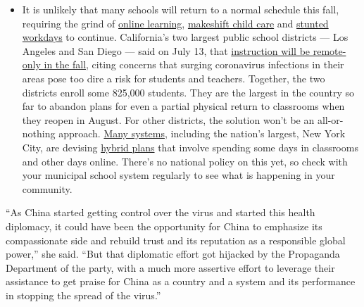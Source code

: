 \begin{itemize}
  \begin{itemize}
  \tightlist
  \item
    It is unlikely that many schools will return to a normal schedule
    this fall, requiring the grind of
    \href{https://www.nytimes3xbfgragh.onion/2020/06/05/us/coronavirus-education-lost-learning.html?action=click\&pgtype=Article\&state=default\&region=MAIN_CONTENT_3\&context=storylines_faq}{online
    learning},
    \href{https://www.nytimes3xbfgragh.onion/2020/05/29/us/coronavirus-child-care-centers.html?action=click\&pgtype=Article\&state=default\&region=MAIN_CONTENT_3\&context=storylines_faq}{makeshift
    child care} and
    \href{https://www.nytimes3xbfgragh.onion/2020/06/03/business/economy/coronavirus-working-women.html?action=click\&pgtype=Article\&state=default\&region=MAIN_CONTENT_3\&context=storylines_faq}{stunted
    workdays} to continue. California's two largest public school
    districts --- Los Angeles and San Diego --- said on July 13, that
    \href{https://www.nytimes3xbfgragh.onion/2020/07/13/us/lausd-san-diego-school-reopening.html?action=click\&pgtype=Article\&state=default\&region=MAIN_CONTENT_3\&context=storylines_faq}{instruction
    will be remote-only in the fall}, citing concerns that surging
    coronavirus infections in their areas pose too dire a risk for
    students and teachers. Together, the two districts enroll some
    825,000 students. They are the largest in the country so far to
    abandon plans for even a partial physical return to classrooms when
    they reopen in August. For other districts, the solution won't be an
    all-or-nothing approach.
    \href{https://bioethics.jhu.edu/research-and-outreach/projects/eschool-initiative/school-policy-tracker/}{Many
    systems}, including the nation's largest, New York City, are
    devising
    \href{https://www.nytimes3xbfgragh.onion/2020/06/26/us/coronavirus-schools-reopen-fall.html?action=click\&pgtype=Article\&state=default\&region=MAIN_CONTENT_3\&context=storylines_faq}{hybrid
    plans} that involve spending some days in classrooms and other days
    online. There's no national policy on this yet, so check with your
    municipal school system regularly to see what is happening in your
    community.
  \end{itemize}
\end{itemize}

``As China started getting control over the virus and started this
health diplomacy, it could have been the opportunity for China to
emphasize its compassionate side and rebuild trust and its reputation as
a responsible global power,'' she said. ``But that diplomatic effort got
hijacked by the Propaganda Department of the party, with a much more
assertive effort to leverage their assistance to get praise for China as
a country and a system and its performance in stopping the spread of the
virus.''

